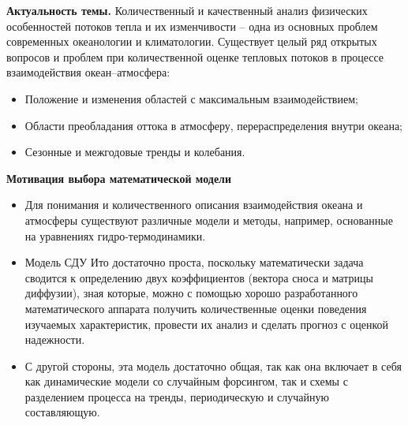 {\actuality} 
\textbf{Актуальность темы.}
Количественный и качественный анализ физических особенностей потоков тепла и их изменчивости --  одна из основных проблем современных океанологии и климатологии. Существует целый ряд открытых вопросов и проблем при количественной оценке тепловых потоков в процессе взаимодействия океан--атмосфера:
\begin{itemize}
	\item Положение и изменения областей с максимальным взаимодействием;
	\item Области преобладания оттока в атмосферу, перераспределения внутри океана;
	\item Сезонные и межгодовые тренды и колебания. 
\end{itemize}

\noindent
\textbf{Мотивация выбора математической модели}
\begin{itemize}
	\item Для понимания и количественного описания взаимодействия океана и атмосферы существуют различные модели и методы, например, основанные на уравнениях гидро-термодинамики. 
	\item Модель СДУ Ито достаточно проста, поскольку математически задача сводится к определению двух коэффициентов (вектора сноса и матрицы диффузии), зная которые, можно с помощью хорошо разработанного математического аппарата получить количественные оценки поведения изучаемых характеристик, провести их анализ и сделать прогноз с оценкой надежности.
	\item С другой стороны, эта модель достаточно общая, так как она включает в себя как динамические модели со случайным форсингом, так и схемы с разделением процесса на тренды, периодическую и случайную составляющую.
\end{itemize}








